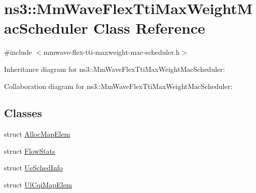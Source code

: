 \hypertarget{classns3_1_1MmWaveFlexTtiMaxWeightMacScheduler}{}\section{ns3\+:\+:Mm\+Wave\+Flex\+Tti\+Max\+Weight\+Mac\+Scheduler Class Reference}
\label{classns3_1_1MmWaveFlexTtiMaxWeightMacScheduler}


{\ttfamily \#include $<$mmwave-\/flex-\/tti-\/maxweight-\/mac-\/scheduler.\+h$>$}



Inheritance diagram for ns3\+:\+:Mm\+Wave\+Flex\+Tti\+Max\+Weight\+Mac\+Scheduler\+:


Collaboration diagram for ns3\+:\+:Mm\+Wave\+Flex\+Tti\+Max\+Weight\+Mac\+Scheduler\+:
\subsection*{Classes}
\begin{DoxyCompactItemize}
\item 
struct \hyperlink{structns3_1_1MmWaveFlexTtiMaxWeightMacScheduler_1_1AllocMapElem}{Alloc\+Map\+Elem}
\item 
struct \hyperlink{structns3_1_1MmWaveFlexTtiMaxWeightMacScheduler_1_1FlowStats}{Flow\+Stats}
\item 
struct \hyperlink{structns3_1_1MmWaveFlexTtiMaxWeightMacScheduler_1_1UeSchedInfo}{Ue\+Sched\+Info}
\item 
struct \hyperlink{structns3_1_1MmWaveFlexTtiMaxWeightMacScheduler_1_1UlCqiMapElem}{Ul\+Cqi\+Map\+Elem}
\end{DoxyCompactItemize}
